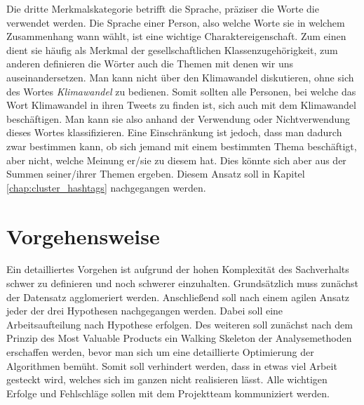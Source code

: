 Die dritte Merkmalskategorie betrifft die Sprache, präziser die Worte die verwendet werden. Die Sprache einer Person, also welche Worte sie in welchem Zusammenhang wann wählt, ist eine wichtige Charaktereigenschaft. Zum einen dient sie häufig als Merkmal der gesellschaftlichen Klassenzugehörigkeit, zum anderen definieren die Wörter auch die Themen mit denen wir uns auseinandersetzen. Man kann nicht über den Klimawandel diskutieren, ohne sich des Wortes \textit{Klimawandel} zu bedienen. Somit sollten alle Personen, bei welche das Wort Klimawandel in ihren Tweets zu finden ist, sich auch mit dem Klimawandel beschäftigen. Man kann sie also anhand der Verwendung oder Nichtverwendung dieses Wortes klassifizieren. Eine Einschränkung ist jedoch, dass man dadurch zwar bestimmen kann, ob sich jemand mit einem bestimmten Thema beschäftigt, aber nicht, welche Meinung er/sie zu diesem hat. Dies könnte sich aber aus der Summen seiner/ihrer Themen ergeben. Diesem Ansatz soll in Kapitel \ref{chap:cluster_hashtags} nachgegangen werden. 
\section{Vorgehensweise}
\label{sec:vorgehensweise}
Ein detailliertes Vorgehen ist aufgrund der hohen Komplexität des Sachverhalts schwer zu definieren und noch schwerer einzuhalten. Grundsätzlich muss zunächst der Datensatz agglomeriert werden. Anschließend soll nach einem agilen Ansatz jeder der drei Hypothesen nachgegangen werden. Dabei soll eine Arbeitsaufteilung nach Hypothese erfolgen. Des weiteren soll zunächst nach dem Prinzip des Most Valuable Products ein Walking Skeleton der Analysemethoden erschaffen werden, bevor man sich um eine detaillierte Optimierung der Algorithmen bemüht. Somit soll verhindert werden, dass in etwas viel Arbeit gesteckt wird, welches sich im ganzen nicht realisieren lässt. Alle wichtigen Erfolge und Fehlschläge sollen mit dem Projektteam kommuniziert werden.